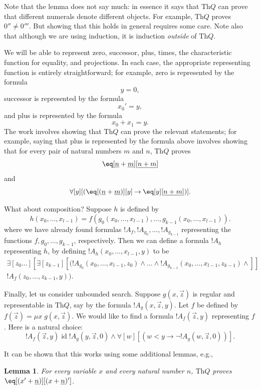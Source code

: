 \documentclass[10pt,a4paper]{article}
\theoremstyle{plain}
\newtheorem{lem}[thm]{Lemma}
\theoremstyle{definition}
\theoremstyle{remark}
\providecommand{\lif}{\mathbin{\rightarrow}}
\providecommand{\lforall}{\mathord{\forall}}
\providecommand{\lexists}{\mathord{\exists}}
\providecommand{\Th}{\ensuremath{\mathrm{Th}}}
\providecommand{\num}[1]{\underline{#1}}
\providecommand{\ident}{\operatorname{id}}
\begin{document}
Note that the lemma does not say much: in essence it says that $\Th{Q}$ can
prove that different numerals denote different objects. For example,
$\Th{Q}$ proves $0'' \neq 0'''$. But showing that this holds in general
requires some care. Note also that although we are using induction, it
is induction \emph{outside} of $\Th{Q}$.

We will be able to represent zero, successor, plus, times, the
characteristic function for equality, and projections. In each case,
the appropriate representing function is entirely straightforward; for
example, zero is represented by the formula
\[
y = 0,
\]
successor is represented by the formula
\[
x_0' = y,
\]
and plus is represented by the formula
\[
x_0 + x_1 = y.
\]
The work involves showing that $\Th{Q}$ can prove the relevant statements;
for example, saying that plus is represented by the formula above
involves showing that for every pair of natural numbers $m$ and $n$,
$\Th{Q}$ proves
\[
\eq[\num n + \num m][\num {n+m}]
\]
and
\[
\lforall[y][(\eq[(\num n + \num m)][y] \lif \eq[y][\num {n+m}])].
\]

What about composition? Suppose $h$ is defined by
\[
h(x_0,\dots,x_{l-1}) = f(g_0(x_0,\dots,x_{l-1}), \dots,
g_{k-1}(x_0,\dots,x_{l-1})).
\]
where we have already found formulas $!A_f, !A_{g_0}, \dots,
!A_{g_{k-1}}$ representing the functions $f,g_0,\dots,g_{k-1}$,
respectively. Then we can define a formula $!A_h$ representing $h$,
by defining $!A_h(x_0,\dots,x_{l-1},y)$ to be
\begin{multline*}
  \lexists[z_0\dots][\lexists[z_{k-1}][(!A_{g_0}(x_0,\dots,x_{l-1},z_0) \land
  \dots \land !A_{g_{k-1}}(x_0,\dots,x_{l-1},z_{k-1}) \land]]\\
  !A_f(z_0,\dots,z_{k-1},y)).
\end{multline*}

Finally, let us consider unbounded search. Suppose $g(x,\vec z)$ is
regular and representable in $\Th{Q}$, say by the formula $!A_g(x,\vec
z,y)$. Let $f$ be defined by $f(\vec z) = \mu x \; g(x,\vec z)$. We would
like to find a formula $!A_f(\vec z,y)$ representing $f$. Here is
a natural choice:
\[
!A_f(\vec z,y) \ident !A_g(y,\vec z,0) \land \lforall[w][(w < y
\lif \lnot !A_g(w,\vec z,0))].
\]

It can be shown that this works using some additional lemmas, e.g.,

\begin{lem}
  For every variable $x$ and every natural number $n$, $\Th{Q}$ proves $\eq[(x'
  + \num n)][(x + \num n)']$.
\end{lem}
\end{document}
